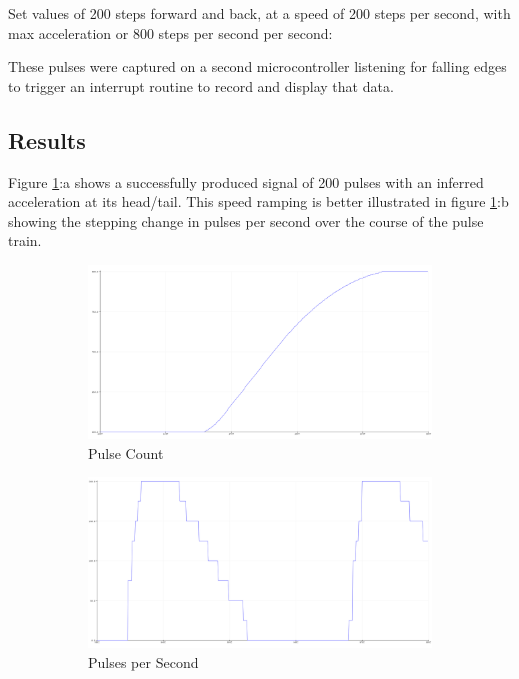 Set values of 200 steps forward and back, at a speed of 200 steps per second, with max acceleration or 800 steps per second per second:

These pulses were captured on a second microcontroller listening for falling edges to trigger an interrupt routine to record and display that data.

\subsection{Results}

Figure \ref{fig:code}:a shows a successfully produced signal of 200 pulses with an inferred acceleration at its head/tail. This speed ramping is better illustrated in figure \ref{fig:code}:b showing the stepping change in pulses per second over the course of the pulse train.

\begin{figure}[h]
    \centering
    \begin{subfigure}{.45\textwidth}
        \centering
        \includegraphics[width=0.8\linewidth]{img/stepper_pulses.PNG}
        \caption{Pulse Count}
    \end{subfigure}%
    \begin{subfigure}{.45\textwidth}
        \centering
        \includegraphics[width=0.8\linewidth]{img/stepper_pulse_acc.PNG}
        \caption{Pulses per Second}
    \end{subfigure}
    \caption{}
    \label{fig:code}
\end{figure}

